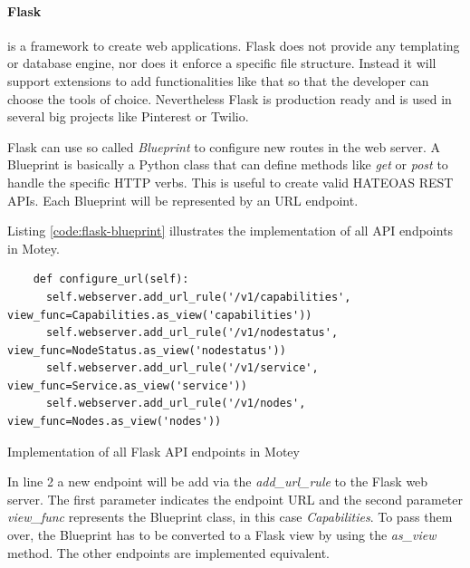\paragraph{Flask} is a framework to create web applications.
Flask does not provide any templating or database engine, nor does it enforce a specific file structure.
Instead it will support extensions to add functionalities like that so that the developer can choose the tools of choice.\autocite[cf.]{Flask:Documentation:Foreword}
Nevertheless Flask is production ready and is used in several big projects like Pinterest\autocite{Quora:Pinterest:Flask} or Twilio\autocite{Twilio:Flask}.

Flask can use so called \textit{Blueprint} to configure new routes in the web server.
A Blueprint is basically a Python class that can define methods like \textit{get} or \textit{post} to handle the specific \ac{HTTP} verbs.
This is useful to create valid \ac{HATEOAS} \ac{REST} \acp{API}.
Each Blueprint will be represented by an \ac{URL} endpoint.

Listing \ref{code:flask-blueprint} illustrates the implementation of all \ac{API} endpoints in Motey.
\begin{listing}[H]
  \begin{verbatim}
    def configure_url(self):
      self.webserver.add_url_rule('/v1/capabilities', view_func=Capabilities.as_view('capabilities'))
      self.webserver.add_url_rule('/v1/nodestatus', view_func=NodeStatus.as_view('nodestatus'))
      self.webserver.add_url_rule('/v1/service', view_func=Service.as_view('service'))
      self.webserver.add_url_rule('/v1/nodes', view_func=Nodes.as_view('nodes'))
  \end{verbatim}
  \caption[Implementation of all Flask API endpoints in Motey]{Implementation of all Flask \ac{API} endpoints in Motey}
  \label{code:flask-blueprint}
\end{listing}

In line 2 a new endpoint will be add via the \textit{add\_url\_rule} to the Flask web server.
The first parameter indicates the endpoint \ac{URL} and the second parameter \textit{view\_func} represents the Blueprint class, in this case \textit{Capabilities}.
To pass them over, the Blueprint has to be converted to a Flask view by using the \textit{as\_view} method.
The other endpoints are implemented equivalent.

